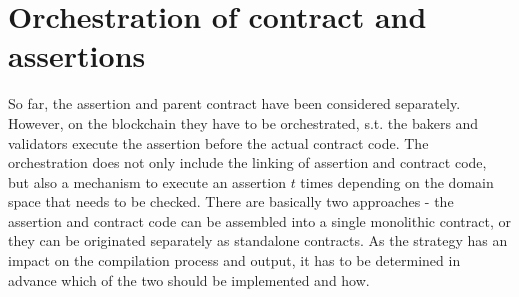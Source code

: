 \section{Orchestration of contract and assertions}
So far, the assertion and parent contract have been considered separately. However, on the blockchain they have to be orchestrated, s.t. the bakers and validators execute the assertion before the actual contract code. The orchestration does not only include the linking of assertion and contract code, but also a mechanism to execute an assertion $t$ times depending on the domain space that needs to be checked. There are basically two approaches - the assertion and contract code can be assembled into a single monolithic contract, or they can be originated separately as standalone contracts. As the strategy has an impact on the compilation process and output, it has to be determined in advance which of the two should be implemented and how.


